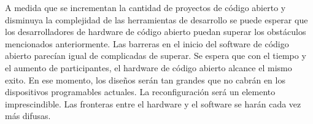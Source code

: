 A medida que se incrementan la cantidad de proyectos de código abierto y disminuya la complejidad de las herramientas de desarrollo se puede esperar que  los desarrolladores de hardware de código abierto puedan superar los obstáculos mencionados anteriormente. Las barreras en el inicio del software de código abierto parecían igual de complicadas de superar. Se espera que con el tiempo y el aumento de participantes, el hardware de código abierto alcance el mismo exito. En ese momento, los diseños serán tan grandes que no cabrán en los dispositivos programables actuales. La reconfiguración será un elemento imprescindible. Las fronteras entre el hardware y el software se harán cada vez más difusas.



